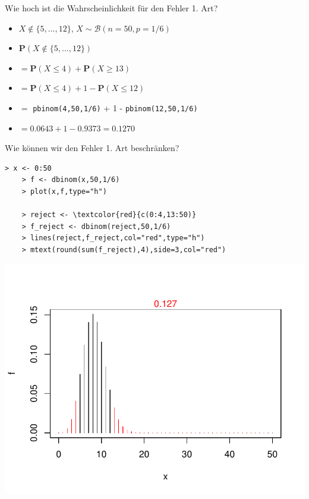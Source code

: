 \documentclass[t,11pt,aspectratio=169]{beamer}
\begin{document}
\begin{frame}{Wie hoch ist die Wahrscheinlichkeit für den Fehler 1. Art?}
\begin{itemize}[<+->]
\item $X\notin \{ 5,...,12 \}$, $X\sim \mathcal{B}(n=50,p=1/6)$
\item $\mathbf{P}(X\notin \{ 5,...,12 \})$
\item[] $= \mathbf{P}(X\leq 4) + \mathbf{P}(X\geq  13)$
\item[] $= \mathbf{P}(X\leq 4) + 1- \mathbf{P}(X\leq  12)$
\item[] $=$ \texttt{pbinom(4,50,1/6)} + 1 - \texttt{pbinom(12,50,1/6)}
\item[] $= 0.0643 + 1 - 0.9373 =  0.1270 $
\end{itemize}
\end{frame}

\begin{frame}[fragile]{Wie können wir den Fehler 1. Art beschränken?}
\begin{minipage}[t]{0.5\textwidth}
	\begin{Verbatim}[fontsize=\small, commandchars=\\\{\}]
	> x <- 0:50
	> f <- dbinom(x,50,1/6)
	> plot(x,f,type="h")
	
	> reject <- \textcolor{red}{c(0:4,13:50)}
	> f_reject <- dbinom(reject,50,1/6)
	> lines(reject,f_reject,col="red",type="h")
	> mtext(round(sum(f_reject),4),side=3,col="red")
	\end{Verbatim}
\end{minipage}
\hfill
\begin{minipage}{0.4\textwidth}
	\includegraphics[width=\textwidth]{Rplot02.pdf}
\end{minipage}
\end{frame}
\end{document}
